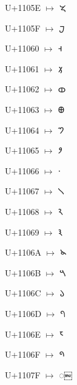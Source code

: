{\noindent U+1105E $\mapsto$ {\brfont 𑁞}\par
\noindent U+1105F $\mapsto$ {\brfont 𑁟}\par
\noindent U+11060 $\mapsto$ {\brfont 𑁠}\par
\noindent U+11061 $\mapsto$ {\brfont 𑁡}\par
\noindent U+11062 $\mapsto$ {\brfont 𑁢}\par
\noindent U+11063 $\mapsto$ {\brfont 𑁣}\par
\noindent U+11064 $\mapsto$ {\brfont 𑁤}\par
\noindent U+11065 $\mapsto$ {\brfont 𑁥}\par
\noindent U+11066 $\mapsto$ {\brfont 𑁦}\par
\noindent U+11067 $\mapsto$ {\brfont 𑁧}\par
\noindent U+11068 $\mapsto$ {\brfont 𑁨}\par
\noindent U+11069 $\mapsto$ {\brfont 𑁩}\par
\noindent U+1106A $\mapsto$ {\brfont 𑁪}\par
\noindent U+1106B $\mapsto$ {\brfont 𑁫}\par
\noindent U+1106C $\mapsto$ {\brfont 𑁬}\par
\noindent U+1106D $\mapsto$ {\brfont 𑁭}\par
\noindent U+1106E $\mapsto$ {\brfont 𑁮}\par
\noindent U+1106F $\mapsto$ {\brfont 𑁯}\par
\noindent U+1107F $\mapsto$ {\brfont 𑁿}\par
}

